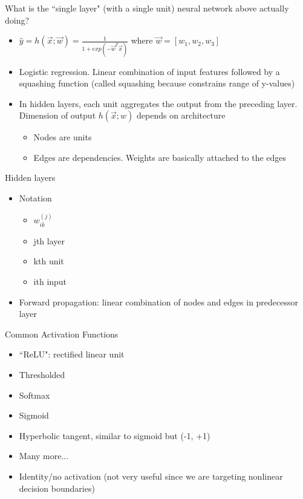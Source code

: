 \documentclass[10pt, oneside]{article}
\begin{document}
What is the ``single layer" (with a single unit) neural network above actually doing?
\begin{itemize}
    \item $\hat y = h(\vec x; \vec w) = \frac{1}{1+exp(-\vec w^T \vec x)}$ where $\vec w = [w_1, w_2, w_3]$
    \item Logistic regression. Linear combination of input features followed by a squashing function (called squashing because constrains range of y-values)
    \item In hidden layers, each unit aggregates the output from the preceding layer. Dimension of output $h(\vec x; w)$ depends on architecture
    \begin{itemize}
        \item Nodes are units
        \item Edges are dependencies. Weights are basically attached to the edges
    \end{itemize}
\end{itemize}
Hidden layers
\begin{itemize}
    \item Notation
    \begin{itemize}
        \item $w_{ik}^{(j)}$
        \item jth layer
        \item kth unit
        \item ith input
    \end{itemize}
    \item Forward propagation: linear combination of nodes and edges in predecessor layer
\end{itemize}
Common Activation Functions
\begin{itemize}
    \item ``ReLU": rectified linear unit
    \item Thresholded
    \item Softmax
    \item Sigmoid
    \item Hyperbolic tangent, similar to sigmoid but (-1, +1)
    \item Many more...
    \item Identity/no activation (not very useful since we are targeting nonlinear decision boundaries)
\end{itemize}
\end{document}
